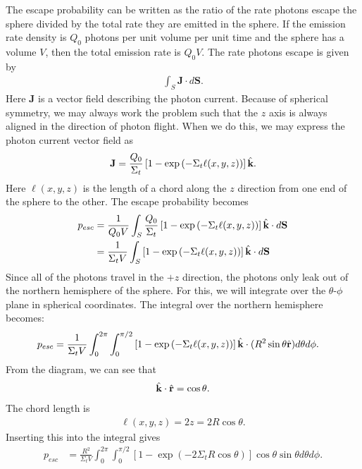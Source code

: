 The escape probability can be written as the ratio of the rate photons escape the sphere divided by the total rate they are emitted in the sphere. If the emission rate density is $Q_0$ photons per unit volume per unit time and the sphere has a volume $V$, then the total emission rate is $Q_0 V$. The rate photons escape is given by
\begin{align}
  \int_S \mathbf{J} \cdot d\mathbf{S}.
\end{align}
Here $\mathbf{J}$ is a vector field describing the photon current. Because of spherical symmetry, we may always work the problem such that the $z$ axis is always aligned in the direction of photon flight. When we do this, we may express the photon current vector field as
\begin{align}
  \mathbf{J} = \frac{Q_0}{\Sigma_t} \left[ 1 - \exp \left( -\Sigma_t \ell(x,y,z) \right) \right] \hat{\mathbf{k}} .
\end{align}
Here $\ell(x,y,z)$ is the length of a chord along the $z$ direction from one end of the sphere to the other. The escape probability becomes
\begin{align}
  p_{esc} &= \frac{1}{Q_0 V} \int_S \frac{Q_0}{\Sigma_t} \left[ 1 - \exp \left( -\Sigma_t \ell(x,y,z) \right) \right] \hat{\mathbf{k}} \cdot d\mathbf{S} \nonumber \\
          &= \frac{1}{\Sigma_t V} \int_S \left[  1 - \exp \left( -\Sigma_t \ell(x,y,z) \right) \right] \hat{\mathbf{k}} \cdot d\mathbf{S}
\end{align}
Since all of the photons travel in the $+z$ direction, the photons only leak out of the northern hemisphere of the sphere. For this, we will integrate over the $\theta$-$\phi$ plane in spherical coordinates. The integral over the northern hemisphere becomes:
\begin{align}
  p_{esc} &= \frac{1}{\Sigma_t V} \int_0^{2\pi} \int_0^{\pi/2} \left[  1 - \exp \left( -\Sigma_t \ell(x,y,z) \right) \right] \hat{\mathbf{k}} \cdot ( R^2 \sin\theta \hat{\mathbf{r}}  ) d\theta d\phi .
\end{align}
From the diagram, we can see that 
\begin{align}
  \hat{\mathbf{k}} \cdot \hat{\mathbf{r}} = \cos \theta .
\end{align}
The chord length is
\begin{align}
  \ell(x,y,z) = 2 z = 2 R \cos \theta.
\end{align}
Inserting this into the integral gives
\begin{align}
  p_{esc} &= \frac{R^2}{\Sigma_t V} \int_0^{2\pi} \int_0^{\pi/2} \left[  1 - \exp \left( -2 \Sigma_t R \cos \theta \right) \right] \cos \theta \sin\theta d\theta d\phi .
\end{align}

